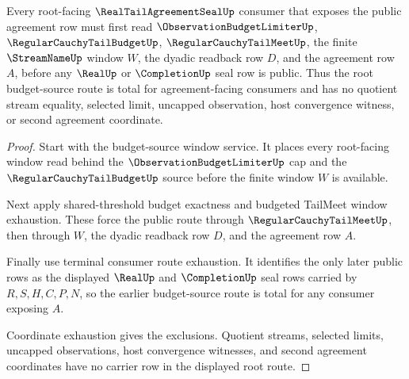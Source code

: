 \begin{theorem}
\label{thm:real-tail-agreement-seal-root-budget-source-totality}
Every root-facing $\RealTailAgreementSealUp$ consumer that exposes the public agreement row must first read $\ObservationBudgetLimiterUp$, $\RegularCauchyTailBudgetUp$, $\RegularCauchyTailMeetUp$, the finite $\StreamNameUp$ window $W$, the dyadic readback row $D$, and the agreement row $A$, before any $\RealUp$ or $\CompletionUp$ seal row is public. Thus the root budget-source route is total for agreement-facing consumers and has no quotient stream equality, selected limit, uncapped observation, host convergence witness, or second agreement coordinate.
\end{theorem}
\begin{proof}
Start with the budget-source window service. It places every root-facing window read behind the $\ObservationBudgetLimiterUp$ cap and the $\RegularCauchyTailBudgetUp$ source before the finite window $W$ is available.

Next apply shared-threshold budget exactness and budgeted TailMeet window exhaustion. These force the public route through $\RegularCauchyTailMeetUp$, then through $W$, the dyadic readback row $D$, and the agreement row $A$.

Finally use terminal consumer route exhaustion. It identifies the only later public rows as the displayed $\RealUp$ and $\CompletionUp$ seal rows carried by $R,S,H,C,P,N$, so the earlier budget-source route is total for any consumer exposing $A$.

Coordinate exhaustion gives the exclusions. Quotient streams, selected limits, uncapped observations, host convergence witnesses, and second agreement coordinates have no carrier row in the displayed root route.
\end{proof}

